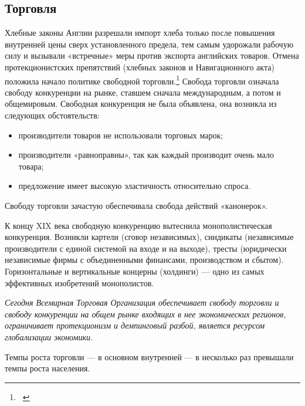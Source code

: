 \documentclass[a4paper]{article}
\newcommand\liststyleWWviiiNumvii{%
\renewcommand\labelitemi{$-$}
\renewcommand\labelitemii{o}
\renewcommand\labelitemiii{${\blacksquare}$}
\renewcommand\labelitemiv{{\textbullet}}
}
\begin{document}
\subsection[Торговля]{\rmfamily Торговля}
{
Хлебные законы Англии разрешали импорт хлеба только после повышения внутренней цены сверх установленного предела, тем
самым удорожали рабочую силу и вызывали «встречные» меры против экспорта английских товаров. Отмена протекционистских
препятствий (хлебных законов и Навигационного акта) положила начало политике свободной
торговли.\footnote{\ } Свобода торговли означала
свободу конкуренции на рынке, ставшем сначала международным, а потом и общемировым. Свободная конкуренция не была
объявлена, она возникла из следующих обстоятельств:}

\liststyleWWviiiNumvii
\begin{itemize}
\item {
производители товаров не использовали торговых марок;}
\item {
производители «равноправны», так как каждый производит очень мало товара;}
\item {
предложение имеет высокую эластичность относительно спроса.}
\end{itemize}
{
Свободу торговли зачастую обеспечивала свобода действий «канонерок».}

{
К концу XIX века свободную конкуренцию вытеснила монополистическая конкуренция. Возникли картели (сговор независимых),
синдикаты (независимые производители с единой системой на входе и на выходе), тресты (юридически независимые фирмы с
объединенными финансами, производством и сбытом). Горизонтальные и вертикальные концерны (холдинги) — одно из самых
эффективных изобретений монополистов.}

{\itshape
Сегодня Всемирная Торговая Организация обеспечивает свободу торговли и свободу конкуренции на общем рынке входящих в нее
экономических регионов, ограничивает протекционизм и демпинговый разбой, является ресурсом глобализации экономики.}

{
Темпы роста торговли — в основном внутренней — в несколько раз превышали темпы роста населения.}
\end{document}
